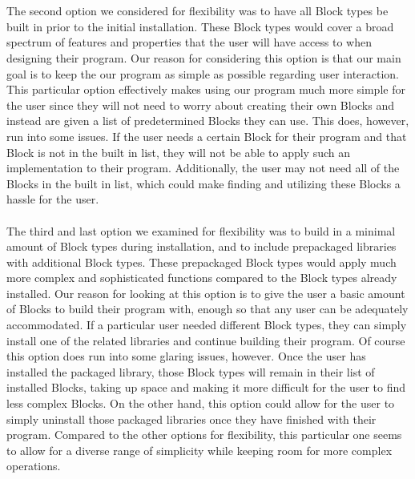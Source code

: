 \documentclass[journal,10pt,onecolumn,compsoc]{IEEEtran} \usepackage[margin=1.0in]{geometry} \usepackage{pdfpages} \usepackage{graphicx}
\begin{document}
\\
\\
\indent The second option we considered for flexibility was to have all Block types be built in prior to the initial installation. These Block types would cover a broad spectrum of features and properties that the user will have access to when designing their program. Our reason for considering this option is that our main goal is to keep the our program as simple as possible regarding user interaction. This particular option effectively makes using our program much more simple for the user since they will not need to worry about creating their own Blocks and instead are given a list of predetermined Blocks they can use. This does, however, run into some issues. If the user needs a certain Block for their program and that Block is not in the built in list, they will not be able to apply such an implementation to their program. Additionally, the user may not need all of the Blocks in the built in list, which could make finding and utilizing these Blocks a hassle for the user.
\\
\\
\indent The third and last option we examined for flexibility was to build in a minimal amount of Block types during installation, and to include prepackaged libraries with additional Block types. These prepackaged Block types would apply much more complex and sophisticated functions compared to the Block types already installed. Our reason for looking at this option is to give the user a basic amount of Blocks to build their program with, enough so that any user can be adequately accommodated. If a particular user needed different Block types, they can simply install one of the related libraries and continue building their program. Of course this option does run into some glaring issues, however. Once the user has installed the packaged library, those Block types will remain in their list of installed Blocks, taking up space and making it more difficult for the user to find less complex Blocks. On the other hand, this option could allow for the user to simply uninstall those packaged libraries once they have finished with their program. Compared to the other options for flexibility, this particular one seems to allow for a diverse range of simplicity while keeping room for more complex operations.
\\
\end{document}
